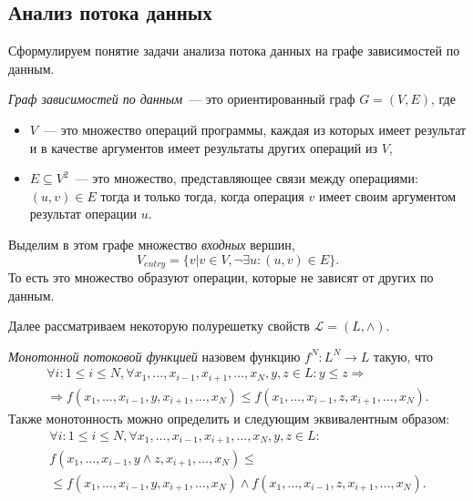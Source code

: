 \documentclass[14pt,titlepage,draft]{extarticle}
\newcommand{\Lattice}{\mathcal{L}}
\newcommand{\meet}{\wedge}
\begin{document}
  \subsection{Анализ потока данных}

    Сформулируем понятие задачи анализа потока данных на графе зависимостей по
    данным.

    \emph{Граф зависимостей по данным}~--- это ориентированный граф
    $G = (V, E)$, где
    \begin{itemize}
      \item $V$~--- это множество операций программы, каждая из которых имеет
            результат и в качестве аргументов имеет результаты других операций
            из $V$,
      \item $E \subseteq V^2$~--- это множество, представляющее связи между
            операциями: $(u, v) \in E$ тогда и только тогда, когда операция $v$
            имеет своим аргументом результат операции $u$.
    \end{itemize}

    Выделим в этом графе множество \emph{входных} вершин,
    \[ V_{entry} = \{ v | v \in V, \lnot \exists u\colon (u, v) \in E \}. \]
    То есть это множество образуют операции, которые не зависят от других по
    данным.

    Далее рассматриваем некоторую полурешетку свойств $\Lattice = (L, \meet)$.

    \emph{Монотонной потоковой функцией} назовем функцию $f^N \colon L^N \to L$
    такую, что
    \begin{gather*}
      \forall i\colon 1 \leq i \leq N,
      \forall x_1, \ldots, x_{i-1}, x_{i+1}, \ldots, x_N, y, z \in L \colon
        y \leq z \Rightarrow \\
        \Rightarrow
        f(x_1, \ldots, x_{i-1}, y, x_{i+1}, \ldots, x_N) \leq
        f(x_1, \ldots, x_{i-1}, z, x_{i+1}, \ldots, x_N).
    \end{gather*}
    Также монотонность можно определить и следующим эквивалентным образом:
    \begin{gather*}
      \forall i\colon 1 \leq i \leq N,
      \forall x_1, \ldots, x_{i-1}, x_{i+1}, \ldots, x_N, y, z \in L \colon \\
        f(x_1, \ldots, x_{i-1}, y \meet z, x_{i+1}, \ldots, x_N) \leq \\
        \leq
        f(x_1, \ldots, x_{i-1}, y,         x_{i+1}, \ldots, x_N) \meet
        f(x_1, \ldots, x_{i-1}, z,         x_{i+1}, \ldots, x_N).
    \end{gather*}
\end{document}
